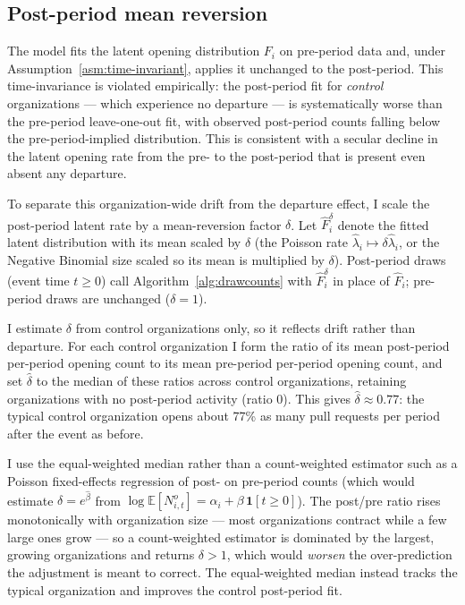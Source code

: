 \documentclass[source/paper/main.tex]{subfiles}
\begin{document}
\subsection{Post-period mean reversion}
\label{sec:mean-reversion}

The model fits the latent opening distribution $F_i$ on pre-period data and, under Assumption~\ref{asm:time-invariant}, applies it unchanged to the post-period.
This time-invariance is violated empirically: the post-period fit for \emph{control} organizations --- which experience no departure --- is systematically worse than the pre-period leave-one-out fit, with observed post-period counts falling below the pre-period-implied distribution.
This is consistent with a secular decline in the latent opening rate from the pre- to the post-period that is present even absent any departure.

To separate this organization-wide drift from the departure effect, I scale the post-period latent rate by a mean-reversion factor $\delta$.
Let $\hat F_i^{\delta}$ denote the fitted latent distribution with its mean scaled by $\delta$ (the Poisson rate $\hat\lambda_i \mapsto \delta\hat\lambda_i$, or the Negative Binomial size scaled so its mean is multiplied by $\delta$).
Post-period draws (event time $t \ge 0$) call Algorithm~\ref{alg:drawcounts} with $\hat F_i^{\delta}$ in place of $\hat F_i$; pre-period draws are unchanged ($\delta = 1$).

I estimate $\delta$ from control organizations only, so it reflects drift rather than departure.
For each control organization I form the ratio of its mean post-period per-period opening count to its mean pre-period per-period opening count, and set $\hat\delta$ to the median of these ratios across control organizations, retaining organizations with no post-period activity (ratio $0$).
This gives $\hat\delta \approx 0.77$: the typical control organization opens about 77\% as many pull requests per period after the event as before.

I use the equal-weighted median rather than a count-weighted estimator such as a Poisson fixed-effects regression of post- on pre-period counts (which would estimate $\delta = e^{\hat\beta}$ from $\log\mathbb{E}[N_{i,t}^o] = \alpha_i + \beta\,\mathbf{1}[t \ge 0]$).
The post/pre ratio rises monotonically with organization size --- most organizations contract while a few large ones grow --- so a count-weighted estimator is dominated by the largest, growing organizations and returns $\delta > 1$, which would \emph{worsen} the over-prediction the adjustment is meant to correct.
The equal-weighted median instead tracks the typical organization and improves the control post-period fit.
\end{document}
